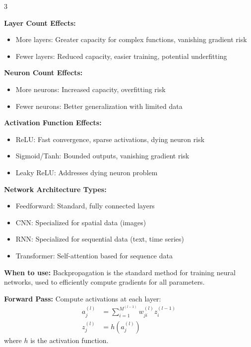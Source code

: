 \documentclass[10pt,landscape]{article}
\begin{document}
\begin{multicols}{3}
\begin{tcolorbox}[breakable, title=3.2 Neural Network Architecture Analysis, colback=neural]
\textbf{Layer Count Effects:}
\begin{itemize}[leftmargin=*,noitemsep,topsep=0pt]
    \item More layers: Greater capacity for complex functions, vanishing gradient risk
    \item Fewer layers: Reduced capacity, easier training, potential underfitting
\end{itemize}

\textbf{Neuron Count Effects:}
\begin{itemize}[leftmargin=*,noitemsep,topsep=0pt]
    \item More neurons: Increased capacity, overfitting risk
    \item Fewer neurons: Better generalization with limited data
\end{itemize}

\textbf{Activation Function Effects:}
\begin{itemize}[leftmargin=*,noitemsep,topsep=0pt]
    \item ReLU: Fast convergence, sparse activations, dying neuron risk
    \item Sigmoid/Tanh: Bounded outputs, vanishing gradient risk
    \item Leaky ReLU: Addresses dying neuron problem
\end{itemize}

\textbf{Network Architecture Types:}
\begin{itemize}[leftmargin=*,noitemsep,topsep=0pt]
    \item Feedforward: Standard, fully connected layers
    \item CNN: Specialized for spatial data (images)
    \item RNN: Specialized for sequential data (text, time series)
    \item Transformer: Self-attention based for sequence data
\end{itemize}
\end{tcolorbox}

\begin{tcolorbox}[breakable, title=3.3 Backpropagation Computation, colback=neural]
\textbf{When to use:} Backpropagation is the standard method for training neural networks, used to efficiently compute gradients for all parameters.

\textbf{Forward Pass:} Compute activations at each layer:
\begin{align}
a^{(l)}_j &= \sum_{i=1}^{M^{(l-1)}} w^{(l)}_{ji} z^{(l-1)}_i\\
z^{(l)}_j &= h(a^{(l)}_j)
\end{align}
where $h$ is the activation function.


\end{tcolorbox}
\end{multicols}
\end{document}
